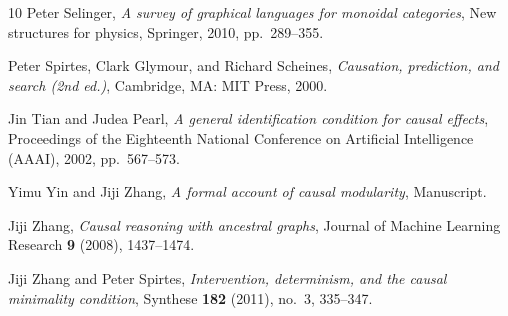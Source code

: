 \documentclass[12pt]{amsart}
\theoremstyle{plain}
\theoremstyle{definition}
\theoremstyle{remark}
\numberwithin{equation}{section}
\theoremstyle{plain}
\newcommand{\0}{\emptyset}
\begin{document}
\begin{thebibliography}{10}
Peter Selinger, \emph{A survey of graphical languages for monoidal categories},
  New structures for physics, Springer, 2010, pp.~289--355.

Peter Spirtes, Clark Glymour, and Richard Scheines, \emph{Causation,
  prediction, and search (2nd ed.)}, Cambridge, MA: MIT Press, 2000.

Jin Tian and Judea Pearl, \emph{A general identification condition for causal
  effects}, Proceedings of the Eighteenth National Conference on Artificial
  Intelligence (AAAI), 2002, pp.~567--573.

Yimu Yin and Jiji Zhang, \emph{A formal account of causal modularity},
  Manuscript.

Jiji Zhang, \emph{Causal reasoning with ancestral graphs}, Journal of Machine
  Learning Research \textbf{9} (2008), 1437--1474.

Jiji Zhang and Peter Spirtes, \emph{Intervention, determinism, and the causal
  minimality condition}, Synthese \textbf{182} (2011), no.~3, 335--347.

\end{thebibliography}
\end{document}
